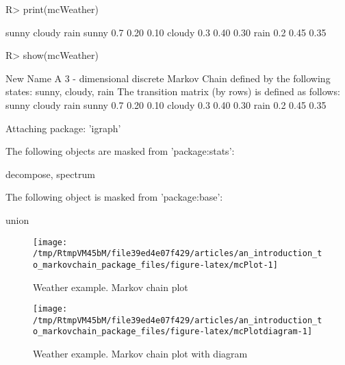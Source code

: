 \documentclass[
  nojss]{jss}
\begin{document}
\begin{CodeChunk}

\begin{CodeInput}
R> print(mcWeather)
\end{CodeInput}

\begin{CodeOutput}
       sunny cloudy rain
sunny    0.7   0.20 0.10
cloudy   0.3   0.40 0.30
rain     0.2   0.45 0.35
\end{CodeOutput}

\begin{CodeInput}
R> show(mcWeather)
\end{CodeInput}

\begin{CodeOutput}
New Name 
 A  3 - dimensional discrete Markov Chain defined by the following states: 
 sunny, cloudy, rain 
 The transition matrix  (by rows)  is defined as follows: 
       sunny cloudy rain
sunny    0.7   0.20 0.10
cloudy   0.3   0.40 0.30
rain     0.2   0.45 0.35
\end{CodeOutput}
\end{CodeChunk}

\begin{CodeChunk}

\begin{CodeOutput}

Attaching package: 'igraph'
\end{CodeOutput}

\begin{CodeOutput}
The following objects are masked from 'package:stats':

    decompose, spectrum
\end{CodeOutput}

\begin{CodeOutput}
The following object is masked from 'package:base':

    union
\end{CodeOutput}
\begin{figure}

{\centering \texttt{[image: /tmp/RtmpVM45bM/file39ed4e07f429/articles/an\_introduction\_to\_markovchain\_package\_files/figure-latex/mcPlot-1]} 

}

\caption[Weather example]{Weather example. Markov chain plot}\label{fig:mcPlot}
\end{figure}
\end{CodeChunk}

\begin{CodeChunk}
\begin{figure}

{\centering \texttt{[image: /tmp/RtmpVM45bM/file39ed4e07f429/articles/an\_introduction\_to\_markovchain\_package\_files/figure-latex/mcPlotdiagram-1]} 

}

\caption[Weather example]{Weather example. Markov chain plot with diagram}\label{fig:mcPlotdiagram}
\end{figure}
\end{CodeChunk}
\end{document}
